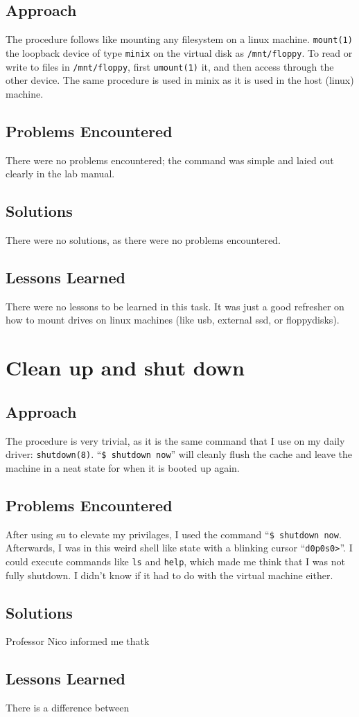 \documentclass[11pt]{article}
\begin{document}
\subsection{Approach}
The procedure follows like mounting any filesystem on a linux machine. {\tt mount(1)} the loopback device of type {\tt minix} on the virtual disk as {\tt /mnt/floppy}. To read or write to files in {\tt /mnt/floppy}, first {\tt umount(1)} it, and then access through the other device. The same procedure is used in minix as it is used in the host (linux) machine.

\subsection{Problems Encountered}
There were no problems encountered; the command was simple and laied out clearly in the lab manual.

\subsection{Solutions}
There were no solutions, as there were no problems encountered.

\subsection{Lessons Learned}
There were no lessons to be learned in this task. It was just a good refresher on how to mount drives on linux machines (like usb, external ssd, or floppydisks).

\section{Clean up and shut down}
\subsection{Approach}
The procedure is very trivial, as it is the same command that I use on my daily driver: {\tt shutdown(8)}. ``{\tt \$ shutdown now}'' will cleanly flush the cache and leave the machine in a neat state for when it is booted up again.

\subsection{Problems Encountered}
After using su to elevate my privilages, I used the command ``{\tt \$ shutdown now}. Afterwards, I was in this weird shell like state with a blinking cursor ``{\tt d0p0s0>}''. I could execute commands like {\tt ls} and {\tt help}, which made me think that I was not fully shutdown. I didn't know if it had to do with the virtual machine either.

\subsection{Solutions}
Professor Nico informed me thatk

\subsection{Lessons Learned}
There is a difference between
\end{document}

